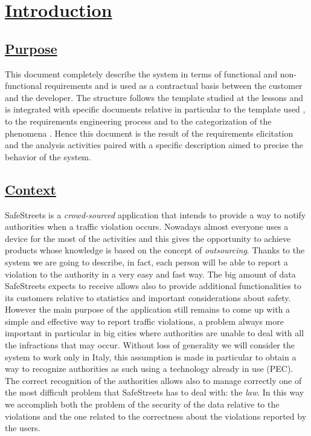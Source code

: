 \section[Introduction]{\hyperlink{toc}{Introduction}}
\label{sec:introduction}
\subsection[Purpose]{\hyperlink{toc}{Purpose}}
	\label{sec:purpose}
	This document completely describe the system in terms of functional and non-functional requirements and is used as a contractual basis between the customer and the developer. The structure follows the template studied at the lessons and is integrated with specific documents relative in particular to the template used \cite{IEEErasd}, to the requirements engineering process \cite{IEEEre} and to the categorization of the phenomena \cite{W&M}. Hence this document is the result of the requirements elicitation and the analysis activities paired with a specific description aimed to precise the behavior of the system.
	
\subsection[Context]{\hyperlink{toc}{Context}}
	SafeStreets is a \emph{crowd-sourced} application that intends to provide a way to notify authorities when a traffic violation occurs. Nowadays almost everyone uses a device for the most of the activities and this gives the opportunity to achieve products whose knowledge is based on the concept of \emph{outsourcing}. Thanks to the system we are going to describe, in fact, each person will be able to report a violation to the authority in a very easy and fast way. The big amount of data SafeStreets expects to receive allows also to provide additional functionalities to its customers relative to statistics and important considerations about safety. However the main purpose of the application still remains to come up with a simple and effective way to report traffic violations, a problem always more important in particular in big cities where authorities are unable to deal with all the infractions that may occur. Without loss of generality we will consider the system to work only in Italy, this assumption is made in particular to obtain a way to recognize authorities as such using a technology already in use (PEC). The correct recognition of the authorities allows also to manage correctly one of the most difficult problem that SafeStreets has to deal with: the \emph{law}. In this way we accomplish both the problem of the security of the data relative to the violations and the one related to the correctness about the violations reported by the users.
	
